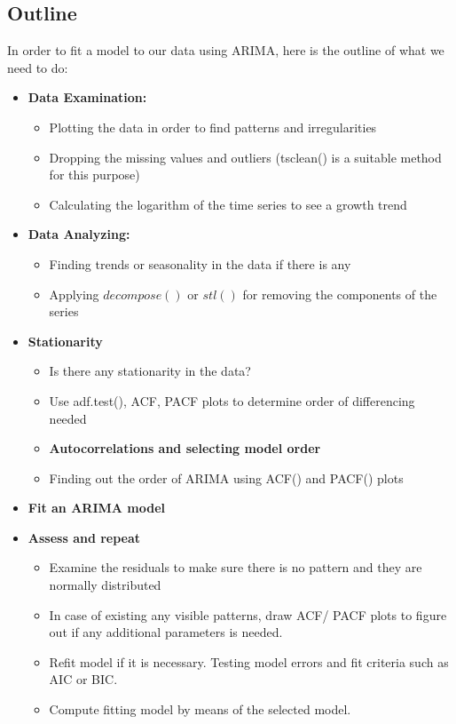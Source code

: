 \documentclass{article}
\begin{document}
\subsection{Outline}
In order to fit a model to our data using ARIMA, here is the outline of what we need to do:
\begin{itemize}
\item \textbf{Data Examination:}
\begin{itemize}
\item Plotting the data in order to find patterns and irregularities
\item Dropping the missing values and outliers (tsclean() is a suitable method for this purpose)
\item Calculating the logarithm of the time series to see a growth trend
\end{itemize}
\item \textbf{Data Analyzing:}
\begin{itemize}
\item Finding trends or seasonality in the data if there is any
\item Applying $decompose()$ or $stl()$ for removing the components of the series
\end{itemize}
\item \textbf{Stationarity}
\begin{itemize}
\item Is there any stationarity in the data?
\item Use adf.test(), ACF, PACF plots to determine order of differencing needed
\end{itemize}
\begin{itemize}
\item \textbf{Autocorrelations and selecting model order}
\item Finding out the order of ARIMA using ACF() and PACF() plots
\end{itemize}
\item \textbf{Fit an ARIMA model}
\item \textbf{Assess and repeat}
\begin{itemize}
\item Examine the  residuals to make sure there is no pattern and they are normally distributed
\item In case of existing any visible patterns, draw ACF/ PACF plots to figure out if any additional parameters is needed.
\item Refit model if it is necessary. Testing model errors and fit criteria such as AIC or BIC.
\item Compute fitting model by means of the selected model.
\end{itemize}
\end{itemize}
\end{document}
